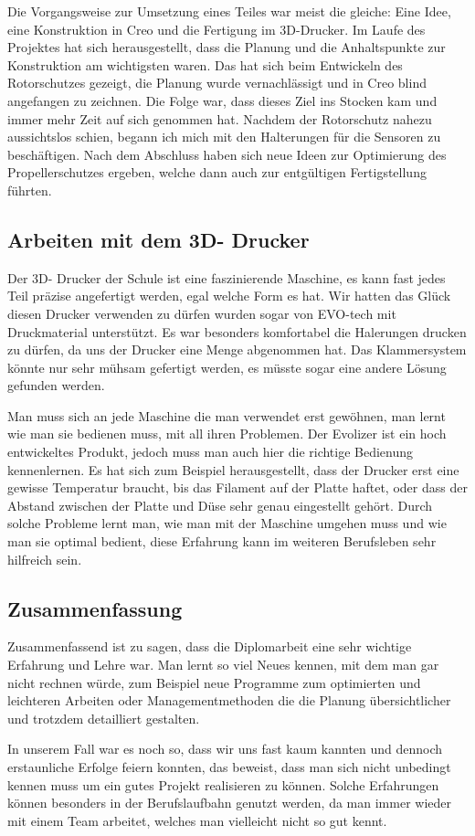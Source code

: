 	Die Vorgangsweise zur Umsetzung eines Teiles war meist die gleiche: Eine Idee, eine Konstruktion in Creo und die Fertigung im 3D-Drucker.
	Im Laufe des Projektes hat sich herausgestellt, dass die Planung und die Anhaltspunkte zur Konstruktion am wichtigsten waren.
	Das hat sich beim Entwickeln des Rotorschutzes gezeigt, die Planung wurde vernachlässigt und in Creo blind angefangen zu zeichnen.
	Die Folge war, dass dieses Ziel ins Stocken kam und immer mehr Zeit auf sich genommen hat.
	Nachdem der Rotorschutz nahezu aussichtslos schien, begann ich mich mit den Halterungen für die Sensoren zu beschäftigen.
	Nach dem Abschluss haben sich neue Ideen zur Optimierung des Propellerschutzes ergeben, welche dann auch zur entgültigen Fertigstellung führten.

	\subsection{Arbeiten mit dem 3D- Drucker}

	Der 3D- Drucker der Schule ist eine faszinierende Maschine, es kann fast jedes Teil präzise angefertigt werden, egal welche Form es hat.
	Wir hatten das Glück diesen Drucker verwenden zu dürfen \bzw wurden sogar von EVO-tech mit Druckmaterial unterstützt.
	Es war besonders komfortabel die Halerungen drucken zu dürfen, da uns der Drucker eine Menge abgenommen hat.
	Das Klammersystem könnte nur sehr mühsam gefertigt werden, es müsste sogar eine andere Lösung gefunden werden.

	Man muss sich an jede Maschine die man verwendet erst gewöhnen, man lernt wie man sie bedienen muss, mit all ihren Problemen.
	Der Evolizer ist ein hoch entwickeltes Produkt, jedoch muss man auch hier die richtige Bedienung kennenlernen.
	Es hat sich zum Beispiel herausgestellt, dass der Drucker erst eine gewisse Temperatur braucht, bis das Filament auf der Platte haftet, oder dass der Abstand zwischen der Platte und Düse sehr genau eingestellt gehört.
	Durch solche Probleme lernt man, wie man mit der Maschine umgehen muss und wie man sie optimal bedient, diese Erfahrung kann im weiteren Berufsleben sehr hilfreich sein.

			\newpage

	\subsection{Zusammenfassung}

	Zusammenfassend ist zu sagen, dass die Diplomarbeit eine sehr wichtige Erfahrung und Lehre war.
	Man lernt so viel Neues kennen, mit dem man gar nicht rechnen würde, zum Beispiel neue Programme zum optimierten und leichteren Arbeiten oder Managementmethoden die die Planung übersichtlicher und trotzdem detailliert gestalten.

 	In unserem Fall war es noch so, dass wir uns fast kaum kannten und dennoch erstaunliche Erfolge feiern konnten,
	das beweist, dass man sich nicht unbedingt kennen muss um ein gutes Projekt realisieren zu können. Solche Erfahrungen können besonders in der Berufslaufbahn genutzt werden,
	da man immer wieder mit einem Team arbeitet, welches man vielleicht nicht so gut kennt.
